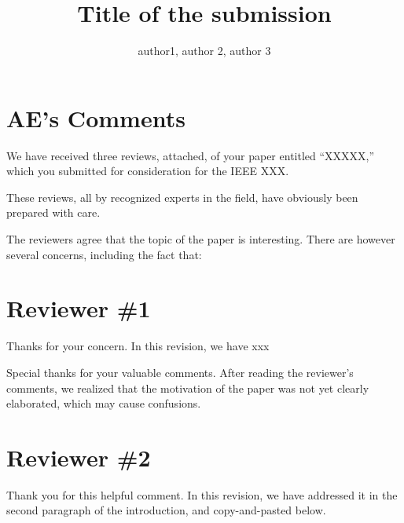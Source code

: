 \documentclass{ar2rc}
\title{Title of the submission}
\author{author1, author 2, author 3}
\begin{document}
\maketitle

\section*{AE's Comments}
We have received three reviews, attached, of your paper entitled 
``XXXXX,'' 
which you submitted for consideration for the IEEE XXX.

These reviews, all by recognized experts in the field, have obviously been prepared with care.

The reviewers agree that the topic of the paper is interesting. There are however several concerns, including the fact that:

\RC
\lipsum[1]

\AR
\blindtext



\section{Reviewer \#1}


\RC
\blindtext

\AR 
Thanks for your concern.
In this revision, 
we have xxx




\RC 
\blindtext

\AR 
Special thanks for your valuable comments.
After reading the reviewer's comments, 
we realized that the motivation of the paper was not yet clearly elaborated, 
which may cause confusions.

\blindmathpaper



\gliMarker %

\section{Reviewer \#2}

\RC 
\lipsum[1]


\AR
Thank you for this helpful comment. In this revision,
we have addressed it in the second paragraph of the introduction, and copy-and-pasted below.


\begin{quote}
{

\lipsum[1]
}

\end{quote}
\end{document}
